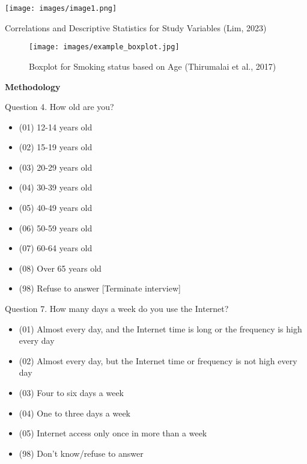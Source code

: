\documentclass{beamer}
\begin{document}
\begin{frame}
    \begin{table}[h]
        \centering
        \texttt{[image: images/image1.png]}
        \caption{Correlations and Descriptive Statistics for Study Variables (Lim, 2023)}
        \label{fig:line_chart}
    \end{table}
\end{frame}

\begin{frame}
    \begin{figure}[h]
        \centering
        \texttt{[image: images/example\_boxplot.jpg]}
        \caption{Boxplot for Smoking status based on Age (Thirumalai et al., 2017)}
        \label{fig:line_chart}
    \end{figure}
\end{frame}

\begin{frame}
    \centering
    \Huge\textbf{Methodology}
\end{frame}


\begin{frame}{Question 4. How old are you?}
    \begin{itemize}
        \item (01)  12-14  years  old
        \item (02)  15-19  years  old
        \item (03)  20-29  years  old
        \item (04)  30-39  years  old
        \item (05)  40-49  years  old
        \item (06)  50-59  years  old
        \item (07)  60-64  years  old
        \item (08)  Over  65  years  old
        \item (98)  Refuse  to  answer  [Terminate interview]
    \end{itemize}
\end{frame}

\begin{frame}{Question 7. How many days a week do you use the Internet?}
    \begin{itemize}
        \item (01) Almost every day, and the Internet time is long or the frequency is high every day
        \item (02) Almost every day, but the Internet time or frequency is not high every day
        \item (03) Four to six days a week
        \item (04) One to three days a week
        \item (05) Internet access only once in more than a week
        \item (98) Don't know/refuse to answer
    \end{itemize}
\end{frame}
\end{document}
